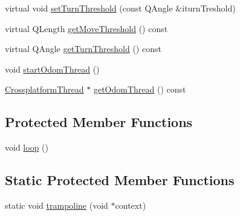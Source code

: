 \begin{DoxyCompactItemize}
virtual void \mbox{\hyperlink{classokapi_1_1OdomChassisController_a771daa37b47909a523571e9173f676d5}{set\+Turn\+Threshold}} (const Q\+Angle \&iturn\+Treshold)
\item 
virtual Q\+Length \mbox{\hyperlink{classokapi_1_1OdomChassisController_a6523c9291a330272edcf951e6653ae02}{get\+Move\+Threshold}} () const
\item 
virtual Q\+Angle \mbox{\hyperlink{classokapi_1_1OdomChassisController_a17e3855a8b8ecdb9a027828d604722d9}{get\+Turn\+Threshold}} () const
\item 
void \mbox{\hyperlink{classokapi_1_1OdomChassisController_a519c7ad1905fbf9132c95e1e14bc973c}{start\+Odom\+Thread}} ()
\item 
\mbox{\hyperlink{classCrossplatformThread}{Crossplatform\+Thread}} $\ast$ \mbox{\hyperlink{classokapi_1_1OdomChassisController_a6ab78730e502dc551894e7efdb9f4edf}{get\+Odom\+Thread}} () const
\end{DoxyCompactItemize}
\subsection*{Protected Member Functions}
\begin{DoxyCompactItemize}
\item 
void \mbox{\hyperlink{classokapi_1_1OdomChassisController_aafdbc13dae2d14e13b879dd7d93993c7}{loop}} ()
\end{DoxyCompactItemize}
\subsection*{Static Protected Member Functions}
\begin{DoxyCompactItemize}
\item 
static void \mbox{\hyperlink{classokapi_1_1OdomChassisController_a11be9684a858686cfc3204b493422308}{trampoline}} (void $\ast$context)
\end{DoxyCompactItemize}
